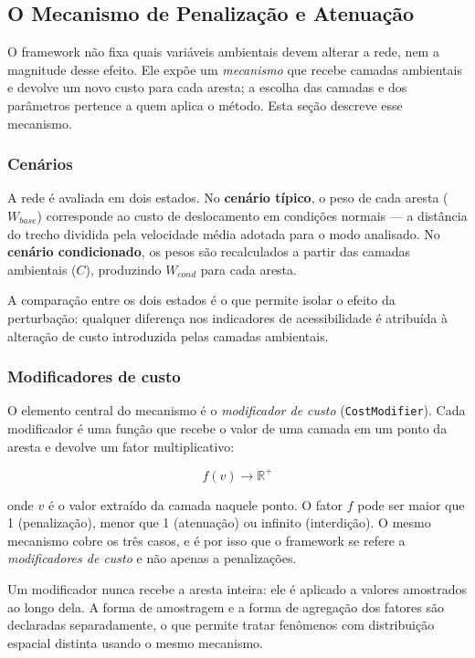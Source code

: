\subsection{O Mecanismo de Penalização e Atenuação}
\label{sec:penalization}

O framework não fixa quais variáveis ambientais devem alterar a rede, nem a
magnitude desse efeito. Ele expõe um \emph{mecanismo} que recebe camadas
ambientais e devolve um novo custo para cada aresta; a escolha das camadas e dos
parâmetros pertence a quem aplica o método. Esta seção descreve esse mecanismo.

\subsubsection{Cenários}

A rede é avaliada em dois estados. No \textbf{cenário típico}, o peso de cada
aresta ($W_{base}$) corresponde ao custo de deslocamento em condições normais —
a distância do trecho dividida pela velocidade média adotada para o modo
analisado. No \textbf{cenário condicionado}, os pesos são recalculados a partir
das camadas ambientais ($C$), produzindo $W_{cond}$ para cada aresta.

A comparação entre os dois estados é o que permite isolar o efeito da
perturbação: qualquer diferença nos indicadores de acessibilidade é atribuída à
alteração de custo introduzida pelas camadas ambientais.

\subsubsection{Modificadores de custo}

O elemento central do mecanismo é o \emph{modificador de custo}
(\texttt{CostModifier}). Cada modificador é uma função que recebe o valor de uma
camada em um ponto da aresta e devolve um fator multiplicativo:

\begin{equation}
  f(v) \rightarrow \mathbb{R}^{+}
\end{equation}

onde $v$ é o valor extraído da camada naquele ponto. O fator $f$ pode ser maior
que 1 (penalização), menor que 1 (atenuação) ou infinito (interdição). O mesmo
mecanismo cobre os três casos, e é por isso que o framework se refere a
\emph{modificadores de custo} e não apenas a penalizações.

Um modificador nunca recebe a aresta inteira: ele é aplicado a valores amostrados
ao longo dela. A forma de amostragem e a forma de agregação dos fatores são
declaradas separadamente, o que permite tratar fenômenos com distribuição
espacial distinta usando o mesmo mecanismo.


